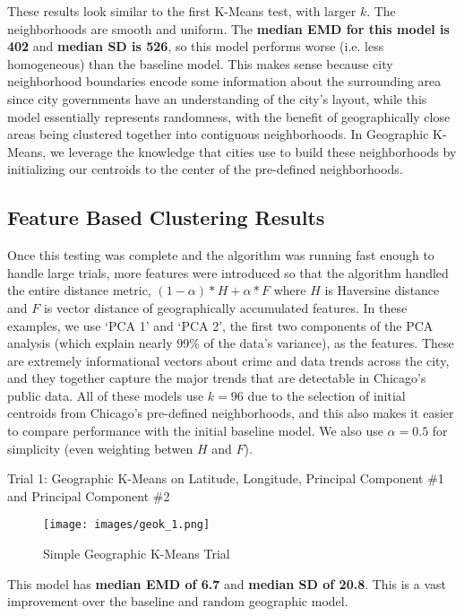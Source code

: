 \documentclass[times new roman,12pt]{article}
\begin{document}
These results look similar to the first K-Means test, with larger $k$. The neighborhoods are smooth and uniform. The \textbf{median EMD for this model is 402} and \textbf{median SD is 526}, so this model performs worse (i.e. less homogeneous) than the baseline model. This makes sense because city neighborhood boundaries encode some information about the surrounding area since city governments have an understanding of the city's layout, while this model essentially represents randomness, with the benefit of geographically close areas being clustered together into contiguous neighborhoods. In Geographic K-Means, we leverage the knowledge that cities use to build these neighborhoods by initializing our centroids to the center of the pre-defined neighborhoods. 

\subsection{Feature Based Clustering Results}

Once this testing was complete and the algorithm was running fast enough to handle large trials, more features were introduced so that the algorithm handled the entire distance metric, $(1-\alpha) * H + \alpha * F$ where $H$ is Haversine distance and $F$ is vector distance of geographically accumulated features. In these examples, we use `PCA 1' and `PCA 2', the first two components of the PCA analysis (which explain nearly 99\% of the data's variance), as the features. These are extremely informational vectors about crime and data trends across the city, and they together capture the major trends that are detectable in Chicago's public data. All of these models use $k=96$ due to the selection of initial centroids from Chicago's pre-defined neighborhoods, and this also makes it easier to compare performance with the initial baseline model. We also use $\alpha=0.5$ for simplicity (even weighting betwen $H$ and $F$). 

\vspace{5mm}
\noindent
Trial 1: Geographic K-Means on Latitude, Longitude, Principal Component \#1 and Principal Component \#2

\begin{figure}[H]
\label{geok_1}
\centering
  \texttt{[image: images/geok\_1.png]}
  \caption{Simple Geographic K-Means Trial}
  \label{fig:geok_1}
\end{figure}
\noindent
This model has \textbf{median EMD of 6.7} and \textbf{median SD of 20.8}. This is a vast improvement over the baseline and random geographic model.
\end{document}

